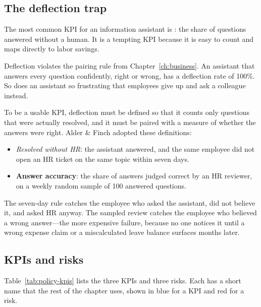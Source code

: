 \subsection{The deflection trap}

The most common KPI for an information assistant is : the share of questions answered without a human. It is a tempting KPI because it is easy to count and maps directly to labor savings.

\begin{watchout}
Deflection violates the pairing rule from Chapter~\ref{ch:business}. An assistant that answers every question confidently, right or wrong, has a deflection rate of 100\%. So does an assistant so frustrating that employees give up and ask a colleague instead.
\end{watchout}

To be a usable KPI, deflection must be defined so that it counts only questions that were actually resolved, and it must be paired with a measure of whether the answers were right. Alder \& Finch adopted these definitions:
\begin{itemize}[itemsep=1pt]
  \item \emph{Resolved without HR}: the assistant answered, and the same employee did not open an HR ticket on the same topic within seven days.
  \item \textbf{Answer accuracy}: the share of answers judged correct by an HR reviewer, on a weekly random sample of 100 answered questions.
\end{itemize}
The seven-day rule catches the employee who asked the assistant, did not believe it, and asked HR anyway. The sampled review catches the employee who believed a wrong answer---the more expensive failure, because no one notices it until a wrong expense claim or a miscalculated leave balance surfaces months later.

\subsection{KPIs and risks}

Table~\ref{tab:policy-kpis} lists the three KPIs and three risks. Each has a short name that the rest of the chapter uses, shown in blue for a KPI and red for a risk.

